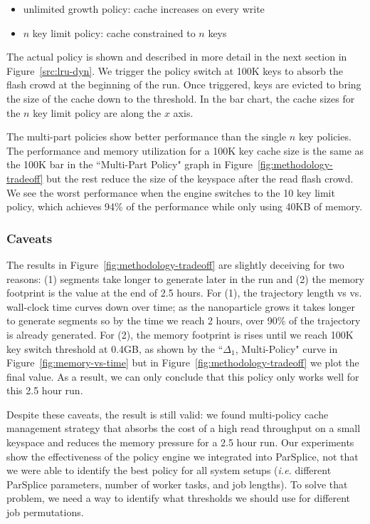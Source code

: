 \begin{itemize}
  \item unlimited growth policy: cache increases on every write
  \item \(n\) key limit policy: cache constrained to \(n\) keys
\end{itemize}

The actual policy is shown and described in more detail in the next section in
Figure~\ref{src:lru-dyn}.  We trigger the policy switch at 100K keys to absorb
the flash crowd at the beginning of the run. Once triggered, keys are evicted
to bring the size of the cache down to the threshold.  In the bar chart, the
cache sizes for the \(n\) key limit policy are along the \(x\) axis.

The multi-part policies show better performance than the single \(n\) key
policies. The performance and memory utilization for a 100K key cache size is
the same as the 100K bar in the ``Multi-Part Policy" graph in  Figure~\ref{fig:methodology-tradeoff} but
the rest reduce the size of the keyspace after the read flash crowd.  We see
the worst performance when the engine switches to the 10 key limit policy,
which achieves 94\% of the performance while only using 40KB of memory. 

\subsubsection*{Caveats}

The results in Figure~\ref{fig:methodology-tradeoff} are slightly deceiving for
two reasons: (1) segments take longer to generate later in the run and (2) the
memory footprint is the value at the end of 2.5 hours.  For (1), the trajectory
length vs vs.  wall-clock time curves down over time; as the nanoparticle grows
it takes longer to generate segments so by the time we reach 2 hours, over 90\%
of the trajectory is already generated.  For (2), the memory footprint is rises
until we reach 100K key switch threshold at 0.4GB, as shown by the
``\(\Delta_1\), Multi-Policy" curve in Figure~\ref{fig:memory-vs-time} but in
Figure~\ref{fig:methodology-tradeoff} we plot the final value. As a result, we
can only conclude that this policy only works well for this 2.5 hour run.

Despite these caveats, the result is still valid: we found multi-policy cache 
management strategy that absorbs the cost of a high read throughput on a small
keyspace and reduces the memory pressure for a 2.5 hour run. Our experiments
show the effectiveness of the policy engine we integrated into
ParSplice, not that we were able to identify the best policy for all system
setups ({\it i.e.} different ParSplice parameters, number of worker tasks, and
job lengths).  To solve that problem, we need a way to identify what thresholds
we should use for different job permutations.

